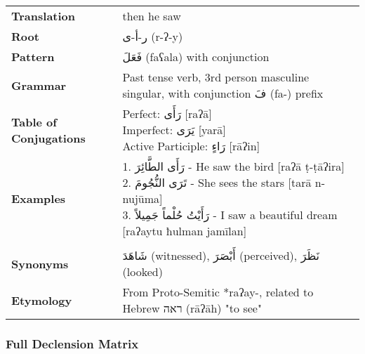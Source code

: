 \documentclass[letter,12pt]{article}
\begin{document}
\begin{tabular}{p{3cm}p{10cm}}
\toprule
\textbf{Translation} & then he saw \\
\textbf{Root} & \textarabic{ر-أ-ى} (r-ʔ-y) \\
\textbf{Pattern} & \textarabic{فَعَلَ} (faʕala) with conjunction \\
\textbf{Grammar} & Past tense verb, 3rd person masculine singular, with conjunction \textarabic{فَ} (fa-) prefix \\
\textbf{Table of Conjugations} & \makecell[l]{
Perfect: \textarabic{رَأَى} [raʔā]\\
Imperfect: \textarabic{يَرَى} [yarā]\\
Active Participle: \textarabic{رَاءٍ} [rāʔin]
} \\
\textbf{Examples} & \makecell[l]{\parbox{9.5cm}{
1. \textarabic{رَأَى الطَّائِرَ} - He saw the bird [raʔā ṭ-ṭāʔira]\\
2. \textarabic{تَرَى النُّجُومَ} - She sees the stars [tarā n-nujūma]\\
3. \textarabic{رَأَيْتُ حُلْماً جَمِيلاً} - I saw a beautiful dream [raʔaytu ħulman jamīlan]
}} \\
\midrule \\
\textbf{Synonyms} & \textarabic{شَاهَدَ} (witnessed), \textarabic{أَبْصَرَ} (perceived), \textarabic{نَظَرَ} (looked) \\
\textbf{Etymology} & From Proto-Semitic *raʔay-, related to Hebrew \texthebrew{ראה} (rāʔāh) "to see" \\
\bottomrule
\end{tabular}

\subsubsection*{Full Declension Matrix}
\end{document}
